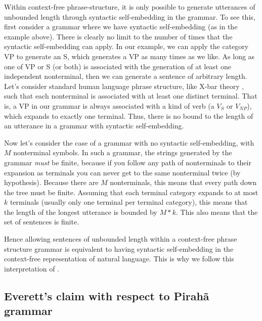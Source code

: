 \documentclass{article}
\begin{document}
Within context-free phrase-structure, it is only possible to generate utterances of unbounded length through syntactic self-embedding in the grammar.  To see this, first consider a grammar where we have syntactic self-embedding (as in the example above). There is clearly no limit to the number of times that the syntactic self-embedding can apply.  In our example, we can apply the category VP to generate an S, which generates a VP as many times as we like.  As long as one of VP or S (or both) is associated with the generation of at least one independent nonterminal, then we can generate a sentence of arbitrary length. Let's consider standard human language phrase structure, like X-bar theory \citep{jackendoff1977x}, such that each nonterminal is associated with at least one distinct terminal. That is, a VP in our grammar is always associated with a kind of verb (a $V_{S}$ or $V_{NP}$), which expands to exactly one terminal. Thus, there is no bound to the length of an utterance in a grammar with syntactic self-embedding.

Now let's consider the case of a grammar with no syntactic self-embedding, with $M$ nonterminal symbols. In such a grammar, the strings generated by the grammar \textit{must} be finite, because if you follow any path of nonterminals to their expansion as terminals you can never get to the same nonterminal twice (by hypothesis). Because there are $M$ nonterminals, this means that every path down the tree must be finite. Assuming that each terminal category expands to at most $k$ terminals (usually only one terminal per terminal category), this means that the length of the longest utterance is bounded by $M*k$. This also means that the set of sentences is finite.

Hence allowing sentences of unbounded length within a context-free phrase structure grammar is
equivalent to having syntactic self-embedding in the context\hyp free representation of natural language.  This is why we follow this interpretation of \cite{hauser2002faculty}.


\subsection{Everett's claim with respect to Pirahã grammar}
\end{document}
